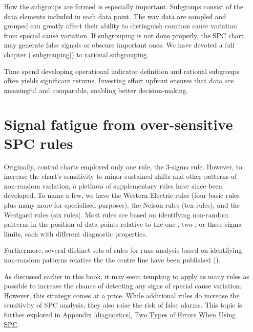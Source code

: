 \documentclass[
]{book}
\begin{document}
How the subgroups are formed is especially important. Subgroups consist of the data elements included in each data point. The way data are sampled and grouped can greatly affect their ability to distinguish common cause variation from special cause variation. If subgrouping is not done properly, the SPC chart may generate false signals or obscure important ones. We have devoted a full chapter (\ref{subgrouping}) to \hyperref[subgrouping]{rational subgrouping}.

Time spend developing operational indicator definition and rational subgroups often yields significant returns. Investing effort upfront ensures that data are meaningful and comparable, enabling better decision-making.

\section{Signal fatigue from over-sensitive SPC rules}\label{signal-fatigue-from-over-sensitive-spc-rules}

Originally, control charts employed only one rule, the 3-sigma rule. However, to increase the chart's sensitivity to minor sustained shifts and other patterns of non-random variation, a plethora of supplementary rules have since been developed. To name a few, we have the Western Electric rules (four basic rules plus many more for specialised purposes), the Nelson rules (ten rules), and the Westgard rules (six rules). Most rules are based on identifying non-random patterns in the position of data points relative to the one-, two-, or three-sigma limits, each with different diagnostic properties.

Furthermore, several distinct sets of rules for runs analysis based on identifying non-random patterns relative the the centre line have been published ().

As discussed earlier in this book, it may seem tempting to apply as many rules as possible to increase the chance of detecting any signs of special cause variation. However, this strategy comes at a price. While additional rules do increase the sensitivity of SPC analysis, they also raise the risk of false alarms. This topic is further explored in Appendix \ref{diagnostics}, \hyperref[diagnostics]{Two Types of Errors When Using SPC}.
\end{document}
